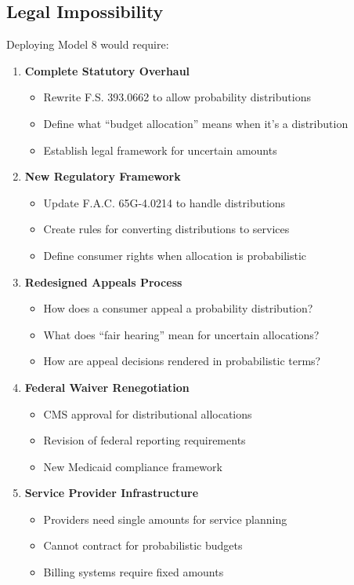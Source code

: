 \subsection{Legal Impossibility}


Deploying Model 8 would require:

\begin{enumerate}
    \item \textbf{Complete Statutory Overhaul}
    \begin{itemize}
        \item Rewrite F.S. 393.0662 to allow probability distributions
        \item Define what ``budget allocation'' means when it's a distribution
        \item Establish legal framework for uncertain amounts
    \end{itemize}
    
    \item \textbf{New Regulatory Framework}
    \begin{itemize}
        \item Update F.A.C. 65G-4.0214 to handle distributions
        \item Create rules for converting distributions to services
        \item Define consumer rights when allocation is probabilistic
    \end{itemize}
    
    \item \textbf{Redesigned Appeals Process}
    \begin{itemize}
        \item How does a consumer appeal a probability distribution?
        \item What does ``fair hearing'' mean for uncertain allocations?
        \item How are appeal decisions rendered in probabilistic terms?
    \end{itemize}
    
    \item \textbf{Federal Waiver Renegotiation}
    \begin{itemize}
        \item CMS approval for distributional allocations
        \item Revision of federal reporting requirements
        \item New Medicaid compliance framework
    \end{itemize}
    
    \item \textbf{Service Provider Infrastructure}
    \begin{itemize}
        \item Providers need single amounts for service planning
        \item Cannot contract for probabilistic budgets
        \item Billing systems require fixed amounts
    \end{itemize}
\end{enumerate}

